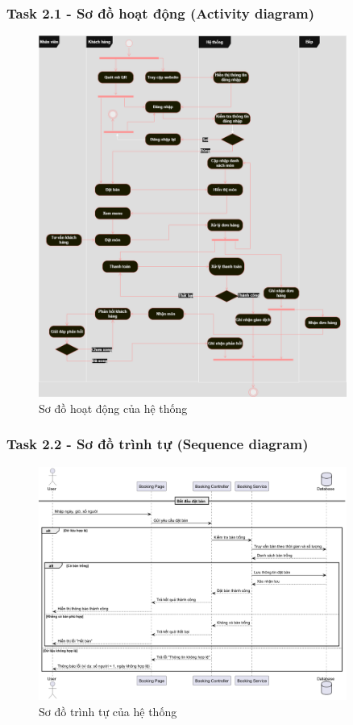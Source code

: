 \documentclass[a4paper]{article}
\begin{document}
\begin{itemize}
        \subsubsection{Task 2.1 - Sơ đồ hoạt động (Activity diagram)}
        \begin{figure}[H]
            \centering
            \includegraphics[width=0.9\textwidth]{task21.png}
            \caption{Sơ đồ hoạt động của hệ thống}
            \label{fig:task21}
        \end{figure}
        \subsubsection{Task 2.2 - Sơ đồ trình tự (Sequence diagram)}
        \begin{figure}[H]
            \centering
            \includegraphics[width=0.9\textwidth]{task22.png}
            \caption{Sơ đồ trình tự của hệ thống}
            \label{fig:task22}
        \end{figure}

\end{itemize}
\end{document}

